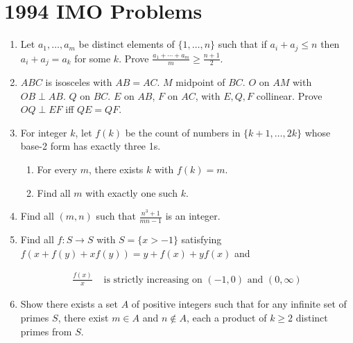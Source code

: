 \documentclass{article}
\begin{document}
\section*{1994 IMO Problems}

\begin{enumerate}

\item Let $a_1,\dots,a_m$ be distinct elements of $\{1,\dots,n\}$ such that if $a_i + a_j \le n$ then $a_i+a_j = a_k$ for some $k$. Prove
$\frac{a_1+\cdots+a_m}{m} \ge \frac{n+1}{2}$.

\item $ABC$ is isosceles with $AB=AC$. $M$ midpoint of $BC$. $O$ on $AM$ with $OB \perp AB$. $Q$ on $BC$. $E$ on $AB$, $F$ on $AC$, with $E,Q,F$ collinear. Prove $OQ \perp EF$ iff $QE=QF$.

\item For integer $k$, let $f(k)$ be the count of numbers in $\{k+1,\dots,2k\}$ whose base-2 form has exactly three 1s.
\begin{enumerate}
\item For every $m$, there exists $k$ with $f(k)=m$.
\item Find all $m$ with exactly one such $k$.
\end{enumerate}

\item Find all $(m,n)$ such that $\frac{n^3+1}{mn-1}$ is an integer.

\item Find all $f:S\to S$ with $S=\{x>-1\}$ satisfying  
$f(x+f(y)+xf(y)) = y+f(x)+yf(x)$ and
  
\begin{align}
\frac{f(x)}{x} &\text{ is strictly increasing on } (-1,0) \text{ and } (0,\infty)
\end{align}


\item Show there exists a set $A$ of positive integers such that for any infinite set of primes $S$, there exist $m\in A$ and $n\notin A$, each a product of $k\ge2$ distinct primes from $S$.

\end{enumerate}
\end{document}
